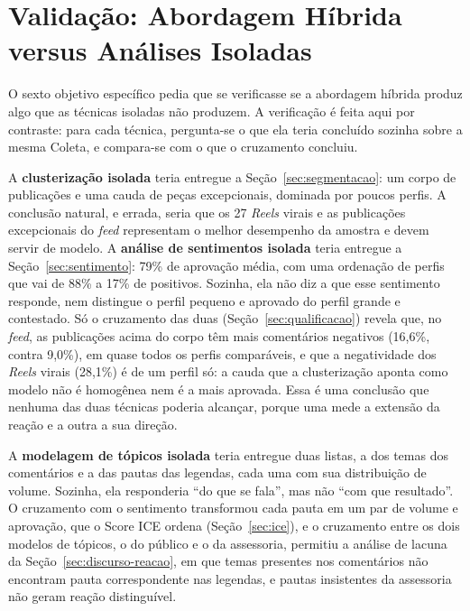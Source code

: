 \section{Validação: Abordagem Híbrida versus Análises Isoladas}\label{sec:validacao}

O sexto objetivo específico pedia que se verificasse se a abordagem híbrida produz algo que as técnicas isoladas não produzem. A verificação é feita aqui por contraste: para cada técnica, pergunta-se o que ela teria concluído sozinha sobre a mesma Coleta, e compara-se com o que o cruzamento concluiu.

A \textbf{clusterização isolada} teria entregue a Seção~\ref{sec:segmentacao}: um corpo de publicações e uma cauda de peças excepcionais, dominada por poucos perfis. A conclusão natural, e errada, seria que os 27 \emph{Reels} virais e as publicações excepcionais do \emph{feed} representam o melhor desempenho da amostra e devem servir de modelo. A \textbf{análise de sentimentos isolada} teria entregue a Seção~\ref{sec:sentimento}: 79\% de aprovação média, com uma ordenação de perfis que vai de 88\% a 17\% de positivos. Sozinha, ela não diz a que esse sentimento responde, nem distingue o perfil pequeno e aprovado do perfil grande e contestado. Só o cruzamento das duas (Seção~\ref{sec:qualificacao}) revela que, no \emph{feed}, as publicações acima do corpo têm mais comentários negativos (16,6\%, contra 9,0\%), em quase todos os perfis comparáveis, e que a negatividade dos \emph{Reels} virais (28,1\%) é de um perfil só: a cauda que a clusterização aponta como modelo não é homogênea nem é a mais aprovada. Essa é uma conclusão que nenhuma das duas técnicas poderia alcançar, porque uma mede a extensão da reação e a outra a sua direção.

A \textbf{modelagem de tópicos isolada} teria entregue duas listas, a dos temas dos comentários e a das pautas das legendas, cada uma com sua distribuição de volume. Sozinha, ela responderia ``do que se fala'', mas não ``com que resultado''. O cruzamento com o sentimento transformou cada pauta em um par de volume e aprovação, que o Score ICE ordena (Seção~\ref{sec:ice}), e o cruzamento entre os dois modelos de tópicos, o do público e o da assessoria, permitiu a análise de lacuna da Seção~\ref{sec:discurso-reacao}, em que temas presentes nos comentários não encontram pauta correspondente nas legendas, e pautas insistentes da assessoria não geram reação distinguível.

